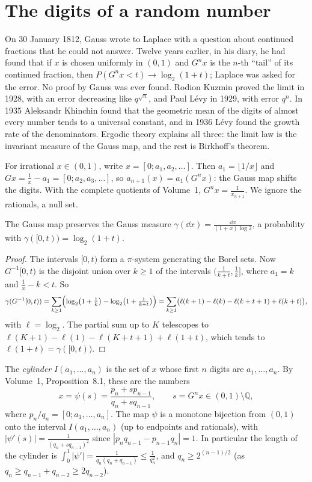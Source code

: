 \section{The digits of a random number}

On 30 January 1812, Gauss wrote to Laplace with a question about continued fractions that he could not answer. Twelve years earlier, in his diary, he had found that if $x$ is chosen uniformly in $(0,1)$ and
$G^n x$ is the $n$-th ``tail'' of its continued fraction, then $P(G^nx<t)\to\log_2(1+t)$; Laplace was asked for the error. No proof by Gauss was ever found. Rodion Kuzmin proved the limit in 1928, with an error decreasing
like $q^{\sqrt n}$, and Paul L\'evy in 1929, with error $q^n$. In 1935 Aleksandr Khinchin found that the geometric mean of the digits of almost every number tends to a universal constant, and in 1936 L\'evy found the growth rate of the
denominators. Ergodic theory explains all three: the limit law is the invariant measure of the Gauss map, and the rest is Birkhoff's theorem.

For irrational $x\in(0,1)$, write $x=[0;a_1,a_2,\dots]$. Then $a_1=\lfloor1/x\rfloor$ and $Gx=\frac1x-a_1=[0;a_2,a_3,\dots]$, so $a_{n+1}(x)=a_1(G^nx)$: the Gauss map shifts the digits. With the complete quotients of Volume~1,
$G^nx=\frac1{x_{n+1}}$. We ignore the rationals, a null set.

\begin{proposition}[Gauss]\label{prop:gaussmeasure}
The Gauss map preserves the Gauss measure $\gamma(\dd x)=\frac{\dd x}{(1+x)\log2}$, a probability with $\gamma([0,t))=\log_2(1+t)$.
\end{proposition}
\begin{proof}
The intervals $[0,t)$ form a $\pi$-system generating the Borel sets. Now $G^{-1}[0,t)$ is the disjoint union over $k\ge1$ of the intervals $(\frac1{k+t},\frac1k]$, where $a_1=k$ and $\frac1x-k<t$. So
\[
\gamma(G^{-1}[0,t))=\sum_{k\ge1}\Bigl(\log_2\bigl(1+\tfrac1k\bigr)-\log_2\bigl(1+\tfrac1{k+t}\bigr)\Bigr)=\sum_{k\ge1}\bigl(\ell(k+1)-\ell(k)-\ell(k+t+1)+\ell(k+t)\bigr),
\]
with $\ell=\log_2$. The partial sum up to $K$ telescopes to $\ell(K+1)-\ell(1)-\ell(K+t+1)+\ell(1+t)$, which tends to $\ell(1+t)=\gamma([0,t))$.
\end{proof}

The \emph{cylinder} $I(a_1,\dots,a_n)$ is the set of $x$ whose first $n$ digits are $a_1,\dots,a_n$. By Volume~1, Proposition~8.1, these are the numbers
\[
x=\psi(s)=\frac{p_n+sp_{n-1}}{q_n+sq_{n-1}},\qquad s=G^nx\in(0,1)\setminus\mathbb Q,
\]
where $p_n/q_n=[0;a_1,\dots,a_n]$. The map $\psi$ is a monotone bijection from $(0,1)$ onto the interval $I(a_1,\dots,a_n)$ (up to endpoints and rationals), with $|\psi'(s)|=\frac1{(q_n+sq_{n-1})^2}$ since $|p_nq_{n-1}-p_{n-1}q_n|=1$. In particular the length of
the cylinder is $\int_0^1|\psi'|=\frac1{q_n(q_n+q_{n-1})}\le\frac1{q_n^2}$, and $q_n\ge2^{(n-1)/2}$ (as $q_n\ge q_{n-1}+q_{n-2}\ge2q_{n-2}$).

